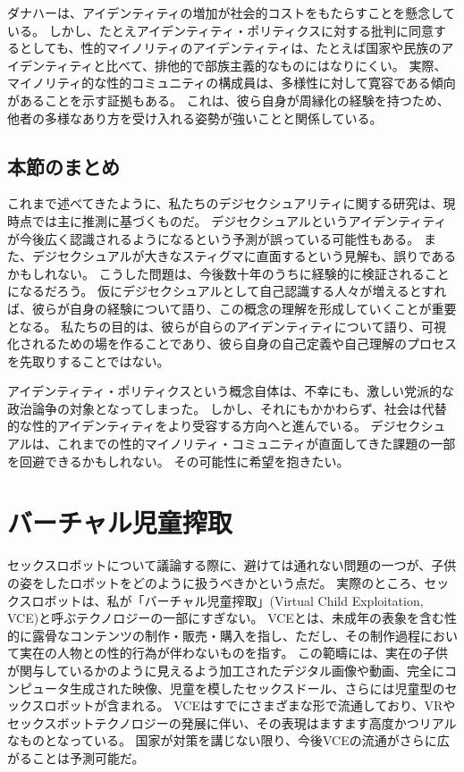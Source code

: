 \documentclass[paper=a4,book,openany]{jlreq} \usepackage{mystyle}
\begin{document}
ダナハーは、アイデンティティの増加が社会的コストをもたらすことを懸念している。
しかし、たとえアイデンティティ・ポリティクスに対する批判に同意するとしても、性的マイノリティのアイデンティティは、たとえば国家や民族のアイデンティティと比べて、排他的で部族主義的なものにはなりにくい。
実際、マイノリティ的な性的コミュニティの構成員は、多様性に対して寛容である傾向があることを示す証拠もある。
これは、彼ら自身が周縁化の経験を持つため、他者の多様なあり方を受け入れる姿勢が強いことと関係している\citep{flores17:_yes_theres_racis_lgbt_commun}。

\subsection{本節のまとめ}

これまで述べてきたように、私たちのデジセクシュアリティに関する研究は、現時点では主に推測に基づくものだ。
デジセクシュアルというアイデンティティが今後広く認識されるようになるという予測が誤っている可能性もある。
また、デジセクシュアルが大きなスティグマに直面するという見解も、誤りであるかもしれない。
こうした問題は、今後数十年のうちに経験的に検証されることになるだろう。
仮にデジセクシュアルとして自己認識する人々が増えるとすれば、彼らが自身の経験について語り、この概念の理解を形成していくことが重要となる。
私たちの目的は、彼らが自らのアイデンティティについて語り、可視化されるための場を作ることであり、彼ら自身の自己定義や自己理解のプロセスを先取りすることではない。

アイデンティティ・ポリティクスという概念自体は、不幸にも、激しい党派的な政治論争の対象となってしまった。
しかし、それにもかかわらず、社会は代替的な性的アイデンティティをより受容する方向へと進んでいる。
デジセクシュアルは、これまでの性的マイノリティ・コミュニティが直面してきた課題の一部を回避できるかもしれない。
その可能性に希望を抱きたい。

\section{バーチャル児童搾取}

セックスロボットについて議論する際に、避けては通れない問題の一つが、子供の姿をしたロボットをどのように扱うべきかという点だ。
実際のところ、セックスロボットは、私が「バーチャル児童搾取」(Virtual Child Exploitation, VCE)と呼ぶテクノロジーの一部にすぎない。
VCEとは、未成年の表象を含む性的に露骨なコンテンツの制作・販売・購入を指し、ただし、その制作過程において実在の人物との性的行為が伴わないものを指す。
この範疇には、実在の子供が関与しているかのように見えるよう加工されたデジタル画像や動画、完全にコンピュータ生成された映像、児童を模したセックスドール、さらには児童型のセックスロボットが含まれる。
VCEはすでにさまざまな形で流通しており、VRやセックスボットテクノロジーの発展に伴い、その表現はますます高度かつリアルなものとなっている。
国家が対策を講じない限り、今後VCEの流通がさらに広がることは予測可能だ。
\end{document}
